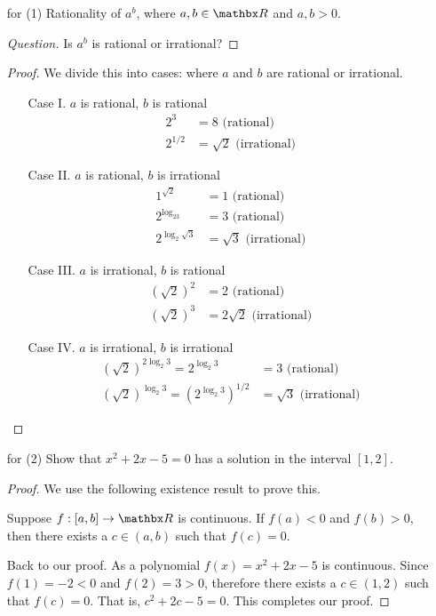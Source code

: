 \begin{example}\hfill
\begin{itemize}[itemsep=1em,leftmargin=4em]
\item[for (1)] Rationality of $a^b$, where $a,b \in \rr$ and $a,b > 0$.
\begin{proof}[Question]\renewcommand{\qed}{}
Is $a^b$ is rational or irrational?
\end{proof}
\begin{proof}
We divide this into cases: where $a$ and $b$ are rational or irrational.
\begin{itemize}[leftmargin=4em]
\item[Case I.] $a$ is rational, $b$ is rational
\begin{align*}
2^3 &= 8 \text{ (rational)}\\
2^{1/2} &= \sqrt{2} \text{ (irrational)}
\end{align*}

\item[Case II.] $a$ is rational, $b$ is irrational
\begin{align*}
1^{\sqrt{2}} &= 1 \text{ (rational)}\\
2^{\log_23} &= 3 \text{ (rational)}\\
2^{\log_2 \sqrt{3}} &= \sqrt{3} \text{ (irrational)}
\end{align*}

\item[Case III.] $a$ is irrational, $b$ is rational
\begin{align*}
(\sqrt{2})^2 &= 2 \text{ (rational)}\\
(\sqrt{2})^3 &= 2\sqrt{2} \text{ (irrational)}
\end{align*}

\item[Case IV.] $a$ is irrational, $b$ is irrational
\begin{align*}
(\sqrt{2})^{2\log_2 3} = 2^{\log_2 3} &= 3 \text{ (rational)}\\
(\sqrt{2})^{\log_2 3} = (2^{\log_2 3})^{1/2} &= \sqrt{3} \text{ (irrational)}
\end{align*}
\end{itemize}
\end{proof}

\item[for (2)] Show that $x^2 + 2x - 5 = 0$ has a solution in the interval $[1,2]$.
\begin{proof}
We use the following existence result to prove this.
\begin{theorem}
Suppose $f:[a,b] \to \rr$ is continuous. If $f(a) < 0$ and $f(b) > 0$, then there exists a $c \in (a,b)$ such that $f(c) = 0$.
\end{theorem}
Back to our proof. As a polynomial $f(x) = x^2 + 2x - 5$ is continuous. Since $f(1) = -2 < 0$ and $f(2) = 3 > 0$, therefore there exists a $c \in (1,2)$ such that $f(c) = 0$. That is, $c^2 + 2c - 5 = 0$. This completes our proof.
\end{proof}


\end{itemize}
\end{example}

